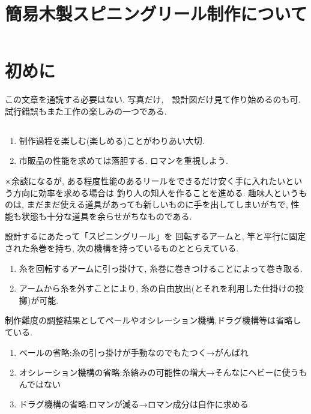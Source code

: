 \documentclass{jarticle}
\title{簡易木製スピニングリール制作について}
\begin{document}
\maketitle

\section{初めに}
この文章を通読する必要はない.
写真だけ,　設計図だけ見て作り始めるのも可.
試行錯誤もまた工作の楽しみの一つである.

\subsection{}
\begin{enumerate}
\item 制作過程を楽しむ(楽しめる)ことがわりあい大切.
\item 市販品の性能を求めては落胆する. ロマンを重視しよう.
\end{enumerate}

※余談になるが, ある程度性能のあるリールをできるだけ安く手に入れたいという方向に効率を求める場合は
釣り人の知人を作ることを進める.
趣味人というものは, まだまだ使える道具があっても新しいものに手を出してしまいがちで,
性能も状態も十分な道具を余らせがちなものである.


設計するにあたって「スピニングリール」を
	回転するアームと, 竿と平行に固定された糸巻を持ち,
	次の機構を持っているものととらえている.
	\begin{enumerate}
	\item
		糸を回転するアームに引っ掛けて, 糸巻に巻きつけることによって巻き取る.
	\item 
		アームから糸を外すことにより, 糸の自由放出(とそれを利用した仕掛けの投擲)が可能.
	\end{enumerate}
	制作難度の調整結果としてペールやオシレーション機構,ドラグ機構等は省略している.
	\begin{enumerate}
	\item
		ペールの省略:糸の引っ掛けが手動なのでもたつく→がんばれ
	\item 
		オシレーション機構の省略:糸絡みの可能性の増大→そんなにヘビーに使うもんではない
	\item 
		ドラグ機構の省略:ロマンが減る→ロマン成分は自作に求める
	\end{enumerate}
\end{document}
